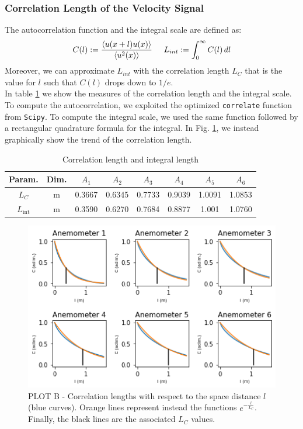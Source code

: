 \documentclass[11pt,titlepage]{article}
\begin{document}
\subsubsection{Correlation Length of the Velocity Signal} \label{correlation_length_of_the_velocity}
The autocorrelation function and the integral scale are defined as:
\begin{equation*}
	C(l):=\frac{\left< u(x+l)u(x)\right>}{\left< u^2(x)\right>} \hspace{5mm} L_{int}:= \int_0^\infty C(l) \, dl
\end{equation*}
Moreover, we can approximate $L_{int}$ with the correlation length $L_C$ that is the value for $l$ such that $C(l)$ drops down to $1/e$. \\
In table \ref{tab2} we show the measures of the correlation length and the integral scale. To compute the autocorrelation, we exploited the optimized \texttt{correlate} function from \texttt{Scipy}. To compute the integral scale, we used the same function followed by a rectangular quadrature formula for the integral.  
In Fig. \ref{fig2}, we instead graphically show the trend of the correlation length. \\
\begin{table}[h]
\centering
\caption{Correlation length and integral length} \label{tab2}
    \begin{tabular}{ | c | c | c | c | c | c | c | c |}
    \hline
    Param. & Dim. & $A_1$ & $A_2$ & $A_3$ & $A_4$ & $A_5$ & $A_6$ \\
    \hline
    $L_C$ & m & 0.3667& 0.6345& 0.7733& 0.9039 & 1.0091 &1.0853 \\
    \hline
    $L_\mathrm{int}$ &m &  0.3590& 0.6270& 0.7684& 0.8877 &1.001 & 1.0760\\
    \hline
    \end{tabular}
\end{table}
	\begin{center} 
	\begin{figure} [h]
		\centering
		\includegraphics[width = 4.5in]{./figures/ex1_2.png}
		\caption{PLOT B - Correlation lengths with respect to the space distance $l$ (blue curves). Orange lines represent instead the functions $e^{-\frac{l}{L_C}}$. Finally, the black lines are the associated $L_C$ values.}
		\label{fig2}
	\end{figure}
\end{center}
\end{document}
